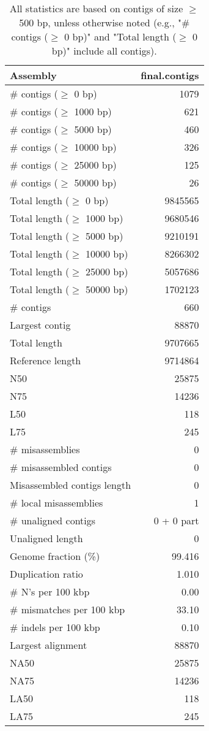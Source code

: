 \documentclass[12pt,a4paper]{article}
\begin{document}
\begin{table}[ht]
\begin{center}
\caption{All statistics are based on contigs of size $\geq$ 500 bp, unless otherwise noted (e.g., "\# contigs ($\geq$ 0 bp)" and "Total length ($\geq$ 0 bp)" include all contigs).}
\begin{tabular}{|l*{1}{|r}|}
\hline
Assembly & final.contigs \\ \hline
\# contigs ($\geq$ 0 bp) & 1079 \\ \hline
\# contigs ($\geq$ 1000 bp) & 621 \\ \hline
\# contigs ($\geq$ 5000 bp) & 460 \\ \hline
\# contigs ($\geq$ 10000 bp) & 326 \\ \hline
\# contigs ($\geq$ 25000 bp) & 125 \\ \hline
\# contigs ($\geq$ 50000 bp) & 26 \\ \hline
Total length ($\geq$ 0 bp) & 9845565 \\ \hline
Total length ($\geq$ 1000 bp) & 9680546 \\ \hline
Total length ($\geq$ 5000 bp) & 9210191 \\ \hline
Total length ($\geq$ 10000 bp) & 8266302 \\ \hline
Total length ($\geq$ 25000 bp) & 5057686 \\ \hline
Total length ($\geq$ 50000 bp) & 1702123 \\ \hline
\# contigs & 660 \\ \hline
Largest contig & 88870 \\ \hline
Total length & 9707665 \\ \hline
Reference length & 9714864 \\ \hline
N50 & 25875 \\ \hline
N75 & 14236 \\ \hline
L50 & 118 \\ \hline
L75 & 245 \\ \hline
\# misassemblies & 0 \\ \hline
\# misassembled contigs & 0 \\ \hline
Misassembled contigs length & 0 \\ \hline
\# local misassemblies & 1 \\ \hline
\# unaligned contigs & 0 + 0 part \\ \hline
Unaligned length & 0 \\ \hline
Genome fraction (\%) & 99.416 \\ \hline
Duplication ratio & 1.010 \\ \hline
\# N's per 100 kbp & 0.00 \\ \hline
\# mismatches per 100 kbp & 33.10 \\ \hline
\# indels per 100 kbp & 0.10 \\ \hline
Largest alignment & 88870 \\ \hline
NA50 & 25875 \\ \hline
NA75 & 14236 \\ \hline
LA50 & 118 \\ \hline
LA75 & 245 \\ \hline
\end{tabular}
\end{center}
\end{table}
\end{document}
